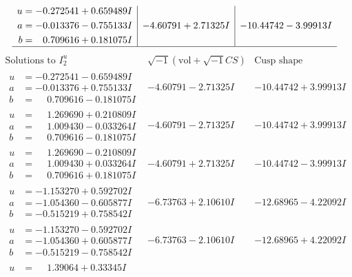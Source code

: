 \documentclass[1p]{elsarticle_modified}
\theoremstyle{definition}
\newcommand{\I}{\sqrt{-1}}
\begin{document}
$$\begin{array}{c|c|c}
\begin{aligned}
u &= -0.272541 + 0.659489 I \\
a &= -0.013376 - 0.755133 I \\
b &= \phantom{-}0.709616 + 0.181075 I\end{aligned}
 & -4.60791 + 2.71325 I & -10.44742 - 3.99913 I\\
 \hline 
 \end{array}$$\newpage$$\begin{array}{c|c|c}  
\text{Solutions to }I^u_{2}& \I (\text{vol} + \sqrt{-1}CS) & \text{Cusp shape}\\
 \hline 
\begin{aligned}
u &= -0.272541 - 0.659489 I \\
a &= -0.013376 + 0.755133 I \\
b &= \phantom{-}0.709616 - 0.181075 I\end{aligned}
 & -4.60791 - 2.71325 I & -10.44742 + 3.99913 I \\ \hline\begin{aligned}
u &= \phantom{-}1.269690 + 0.210809 I \\
a &= \phantom{-}1.009430 - 0.033264 I \\
b &= \phantom{-}0.709616 - 0.181075 I\end{aligned}
 & -4.60791 - 2.71325 I & -10.44742 + 3.99913 I \\ \hline\begin{aligned}
u &= \phantom{-}1.269690 - 0.210809 I \\
a &= \phantom{-}1.009430 + 0.033264 I \\
b &= \phantom{-}0.709616 + 0.181075 I\end{aligned}
 & -4.60791 + 2.71325 I & -10.44742 - 3.99913 I \\ \hline\begin{aligned}
u &= -1.153270 + 0.592702 I \\
a &= -1.054360 - 0.605877 I \\
b &= -0.515219 + 0.758542 I\end{aligned}
 & -6.73763 + 2.10610 I & -12.68965 - 4.22092 I \\ \hline\begin{aligned}
u &= -1.153270 - 0.592702 I \\
a &= -1.054360 + 0.605877 I \\
b &= -0.515219 - 0.758542 I\end{aligned}
 & -6.73763 - 2.10610 I & -12.68965 + 4.22092 I \\ \hline\begin{aligned}
u &= \phantom{-}1.39064 + 0.33345 I \\

\end{aligned}
\end{array}$$
\end{document}
